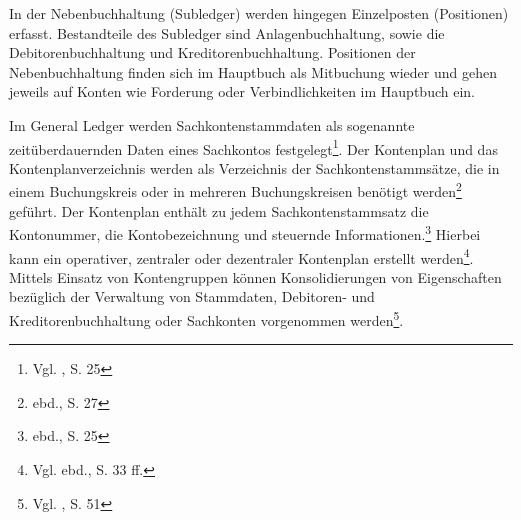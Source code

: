 In der Nebenbuchhaltung (Subledger) werden hingegen Einzelposten (Positionen) erfasst. Bestandteile des Subledger sind Anlagenbuchhaltung, sowie die Debitorenbuchhaltung und Kreditorenbuchhaltung. Positionen der Nebenbuchhaltung finden sich im Hauptbuch als Mitbuchung wieder und gehen jeweils auf Konten wie Forderung oder Verbindlichkeiten im Hauptbuch ein.

Im General Ledger werden Sachkontenstammdaten als sogenannte zeitüberdauernden Daten eines Sachkontos festgelegt\footnote{Vgl. \cite{SAPGL2001}, S. 25}. Der Kontenplan und das Kontenplanverzeichnis werden als Verzeichnis der \glqq […]Sachkontenstammsätze, die in einem Buchungskreis oder in mehreren Buchungskreisen benötigt werden\grqq \footnote{ebd., S. 27} geführt. \glqq Der Kontenplan enthält zu jedem Sachkontenstammsatz die Kontonummer, die Kontobezeichnung und steuernde Informationen.\grqq \footnote{ebd., S. 25} Hierbei kann ein operativer, zentraler oder dezentraler Kontenplan erstellt werden\footnote{Vgl. ebd., S. 33 ff.}. Mittels Einsatz von Kontengruppen können Konsolidierungen von Eigenschaften bezüglich der Verwaltung von Stammdaten, Debitoren- und Kreditorenbuchhaltung oder Sachkonten vorgenommen werden\footnote{Vgl. \cite{Schuler2006}, S. 51}.


